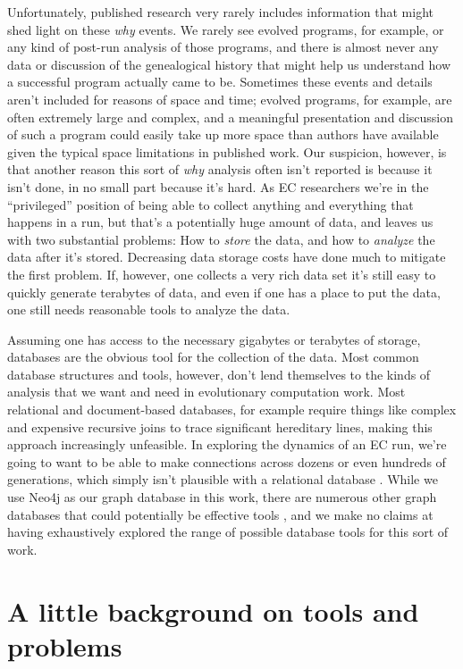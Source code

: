 Unfortunately, published research very rarely includes information that might shed light on 
these \emph{why} events. We rarely see evolved programs, for example, or any kind of post-run analysis
of those programs, and there is almost never any data or discussion of the genealogical history that
might help us understand how a successful program actually came to be. 
Sometimes these events and details aren't included
for reasons of space and time; evolved programs, for example, are often extremely large and complex,
and a meaningful presentation and discussion of such a program could easily take up more space than
authors have available given the typical space limitations in published work.
Our suspicion, however, is that another reason this sort of \emph{why} analysis often isn't 
reported is because it isn't done, in no small part because it's hard. As EC researchers we're in the
``privileged'' position of being able to collect anything and everything that happens in a run, 
but that's a potentially huge amount of data, and leaves us with two substantial problems: 
How to \emph{store} the data, and how to \emph{analyze} the data
after it's stored. 
Decreasing data storage costs have done much to mitigate the first problem.
If, however, one collects a very rich data set it's still easy to quickly generate terabytes of data,
and even if one has a place to put the data, one still needs reasonable tools to analyze the data.

Assuming one has access to the necessary gigabytes or terabytes of storage, 
databases are the obvious tool for the collection of the data. Most common database structures and tools,
however,
don't lend themselves to the kinds of analysis that we want and need in evolutionary computation work. 
Most relational and document-based databases, for example require things like complex and expensive 
recursive joins to trace significant hereditary lines, making this approach increasingly unfeasible.
In exploring the dynamics of an EC run, we're going to want to be able to
make connections across dozens or even hundreds of generations, which simply isn't plausible with a
relational database \citep{Robinson:GraphDB:Book}. 
While we use Neo4j as our graph database in this work, there are 
numerous other 
graph databases that could potentially be effective tools \citep{wiki:GraphDB}, and we make no claims at having
exhaustively explored the range of possible database tools for this sort of work.

\section{A little background on tools and problems}
\label{sec:background}

